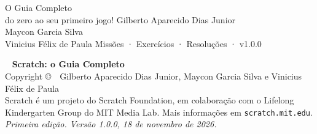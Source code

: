 \documentclass[12pt,openany]{book}
\newcommand{\versaodolivro}{1.0.0}
\newcommand{\datadaversao}{18 de novembro de 2026}
\begin{document}

\capalivro
  {O Guia Completo\\[2pt]\normalfont\normalsize do zero ao seu primeiro jogo!}
  {Gilberto Aparecido Dias Junior \\ Maycon Garcia Silva \\ Vinicius Félix de Paula}
  {Missões · Exercícios · Resoluções · v\versaodolivro}


~\vfill
\thispagestyle{empty}
\noindent\textbf{Scratch: o Guia Completo}\\
Copyright \copyright\ \the\year\ Gilberto Aparecido Dias Junior, Maycon Garcia Silva e Vinicius Félix de Paula\\[6pt]
Scratch é um projeto do Scratch Foundation, em colaboração com o Lifelong Kindergarten Group do MIT Media Lab. Mais informações em \texttt{scratch.mit.edu}.\\[6pt]
\textit{Primeira edição. Versão \versaodolivro, \datadaversao.}
\clearpage


\pagestyle{empty}
\tableofcontents
\cleardoublepage
\pagestyle{fancy}































\end{document}
